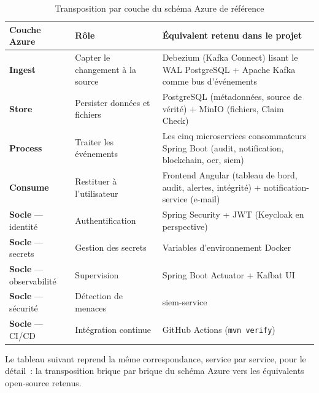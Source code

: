 \documentclass[12pt,a4paper,openany]{report}
\begin{document}
    \begin{table}[H]
    \centering
    \small
    \begin{tabularx}{\textwidth}{p{2.3cm}p{3.4cm}X}
    \toprule
    \textbf{Couche Azure} & \textbf{R\^ole} & \textbf{\'Equivalent retenu dans le projet} \\
    \midrule
    \textbf{Ingest} & Capter le changement \`a la source & Debezium (Kafka Connect) lisant le WAL PostgreSQL + Apache Kafka comme bus d'\'ev\'enements \\[3pt]
    \textbf{Store} & Persister donn\'ees et fichiers & PostgreSQL (m\'etadonn\'ees, source de v\'erit\'e) + MinIO (fichiers, Claim Check) \\[3pt]
    \textbf{Process} & Traiter les \'ev\'enements & Les cinq microservices consommateurs Spring Boot (audit, notification, blockchain, ocr, siem) \\[3pt]
    \textbf{Consume} & Restituer \`a l'utilisateur & Frontend Angular (tableau de bord, audit, alertes, int\'egrit\'e) + notification-service (e-mail) \\
    \midrule
    \textbf{Socle} --- identit\'e & Authentification & Spring Security + JWT (Keycloak en perspective) \\[3pt]
    \textbf{Socle} --- secrets & Gestion des secrets & Variables d'environnement Docker \\[3pt]
    \textbf{Socle} --- observabilit\'e & Supervision & Spring Boot Actuator + Kafbat UI \\[3pt]
    \textbf{Socle} --- s\'ecurit\'e & D\'etection de menaces & siem-service \\[3pt]
    \textbf{Socle} --- CI/CD & Int\'egration continue & GitHub Actions (\texttt{mvn verify}) \\
    \bottomrule
    \end{tabularx}
    \caption{Transposition par couche du sch\'ema Azure de r\'ef\'erence}
    \end{table}

    Le tableau suivant reprend la m\^eme correspondance, service par service, pour le d\'etail~: la transposition brique par brique du sch\'ema Azure vers les \'equivalents open-source retenus.
\end{document}
